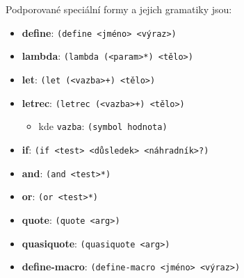 \documentclass[
  master,
  biblatex,
  figures=true,
  theorems,
  sourcecodes,
  glossaries,
  index
]{kidiplom}
\begin{document}
Podporované speciální formy a jejich gramatiky jsou: 


\begin{itemize}
    \item \textbf{define}: \texttt{(define <jméno> <výraz>)}
    \item \textbf{lambda}: \texttt{(lambda (<param>*) <tělo>)} 
    \item \textbf{let}: \texttt{(let (<vazba>+) <tělo>)}
    \item \textbf{letrec}: \texttt{(letrec (<vazba>+) <tělo>)}
    \begin{itemize}
        \item kde \texttt{vazba}: \texttt{(symbol hodnota)}
    \end{itemize}
    \item \textbf{if}: \texttt{(if <test> <důsledek> <náhradník>?)}
    \item \textbf{and}: \texttt{(and <test>*)}
    \item \textbf{or}: \texttt{(or <test>*)}
    \item \textbf{quote}: \texttt{(quote <arg>)}
    \item \textbf{quasiquote}: \texttt{(quasiquote <arg>)}
    \item \textbf{define-macro}: \texttt{(define-macro <jméno> <výraz>)}
\end{itemize}
\end{document}
